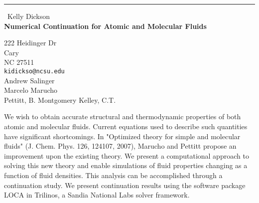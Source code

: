 \documentclass{report}
\begin{document}
\begin{center}
\rule{6in}{1pt} \
{\large Kelly Dickson \\
{\bf Numerical Continuation for Atomic and Molecular Fluids}}

222 Heidinger Dr \\ Cary \\ NC 27511
\\
{\tt kidickso@ncsu.edu}\\
Andrew Salinger\\
Marcelo Marucho\\
	Pettitt, B. Montgomery 
	Kelley, C.T. 
	\end{center}

We wish to obtain accurate structural and thermodynamic properties
of both atomic and molecular fluids. Current equations used to
describe such quantities have significant shortcomings. In "Optimized
theory for simple and molecular fluids" (J. Chem. Phys. 126, 124107,
2007), Marucho and Pettitt propose an improvement upon
the existing theory. We present a computational approach to solving this
new theory and enable simulations of fluid properties changing as a
function of fluid densities. This analysis can be accomplished through a
continuation study. We present continuation results using the software
package LOCA in Trilinos, a Sandia
National Labs solver framework.
\end{document}

